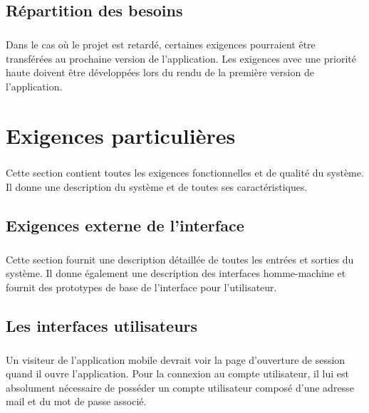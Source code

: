 \documentclass[titlepage, 12pt]{report}
\begin{document}
\section{Répartition des besoins}

\paragraph{}Dans le cas où le projet est retardé, certaines exigences pourraient être transférées au prochaine version de l'application. Les exigences avec une priorité haute doivent être développées lors du rendu de la première version de l'application.

\chapter{Exigences particulières}

\paragraph{}Cette section contient toutes les exigences fonctionnelles et de qualité du système. Il donne une description du système et de toutes ses caractéristiques.

\section{Exigences externe de l'interface}

\paragraph{}Cette section fournit une description détaillée de toutes les entrées et sorties du système. Il donne également une description des interfaces homme-machine et fournit des prototypes de base de l'interface pour l'utilisateur.

\section{Les interfaces utilisateurs}

\paragraph{}Un visiteur de l'application mobile devrait voir la page d'ouverture de session quand il ouvre l'application. Pour la connexion au compte utilisateur, il lui est absolument nécessaire de posséder un compte utilisateur composé d'une adresse mail et du mot de passe associé.
\end{document}
